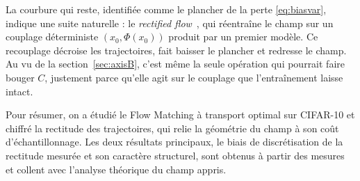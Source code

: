 \documentclass[11pt]{article}
\begin{document}
La courbure qui reste, identifiée comme le plancher de la perte \eqref{eq:biasvar}, indique une suite
naturelle : le \emph{rectified flow}~\cite{liu2023rectified}, qui réentraîne le champ sur un couplage
déterministe $(x_0, \Phi(x_0))$ produit par un premier modèle. Ce recouplage décroise les trajectoires, fait
baisser le plancher et redresse le champ. Au vu de la section~\ref{sec:axisB}, c'est même la seule opération
qui pourrait faire bouger $C$, justement parce qu'elle agit sur le couplage que l'entraînement laisse
intact.

Pour résumer, on a étudié le Flow Matching à transport optimal sur CIFAR-10 et chiffré la rectitude des
trajectoires, qui relie la géométrie du champ à son coût d'échantillonnage. Les deux résultats principaux,
le biais de discrétisation de la rectitude mesurée et son caractère structurel, sont obtenus à partir des
mesures et collent avec l'analyse théorique du champ appris.

\printbibliography
\end{document}
